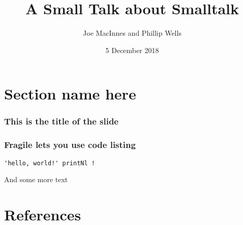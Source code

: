 \documentclass{beamer}
\title{A Small Talk about Smalltalk}
\author{Joe MacInnes and Phillip Wells}
\institute[College of Wooster]
{
  College of Wooster\\
  Programming Languages
}
\date{5 December 2018}
\begin{document}
\frame{\titlepage}
\section{Section name here}

\begin{frame}
  \frametitle{This is the title of the slide}
\end{frame}

\begin{frame}[fragile] 
  \frametitle{Fragile lets you use code listing}

  \begin{lstlisting}[frame=single]
    'hello, world!' printNl !
  \end{lstlisting}

  And some more text

\end{frame}


\section{References} 


\end{document}
